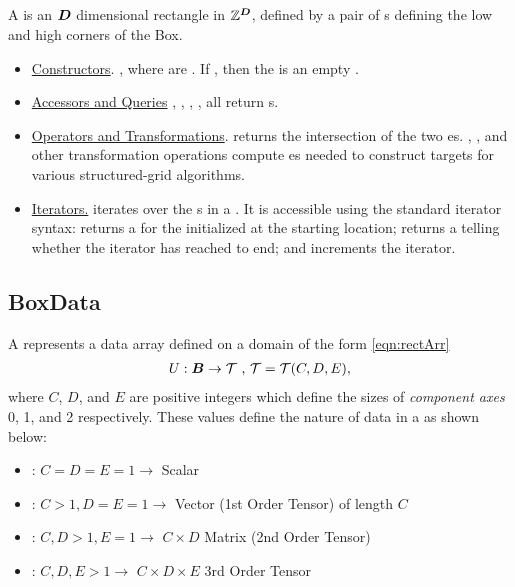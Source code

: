 \documentclass[12pt]{article}
\begin{document}
\subsection{}

A  is an ${\boldsymbol{D}}$ dimensional rectangle in $\mathbb{Z}^{{\boldsymbol{D}}}$, defined by a pair of s defining the low and high corners of the Box. 

\begin{itemize}
\item
\underline{Constructors}. , where  are . If , then the  is an empty .

\item
\underline{Accessors and Queries}
, , ,  ,  all return s. 
\item
\underline{Operators and Transformations}. 
 returns the intersection of the two es. , ,  and other transformation operations compute es needed to construct  targets for various structured-grid algorithms.
\item
\underline{Iterators.}
 iterates over the s in a . It is accessible using the standard iterator syntax:  returns a  for the  initialized at the starting location;  returns a  telling whether the iterator has reached to end; and  increments the iterator.
\end{itemize}
\subsection{BoxData}

A  represents a data array defined on a  domain of the form \eqref{eqn:rectArr}
\begin{gather*}
U:{\boldsymbol{B}} \rightarrow \mathcal{T} \hbox{ , } \mathcal{T} = \mathcal{T}(C,D,E),
\end{gather*}
where $C$, $D$, and $E$ are positive integers which define the sizes of \textit{component axes} 0, 1, and 2 respectively. These values define the nature of data in a  as shown below:

\begin{itemize}
\item: $C=D=E=1\rightarrow$ Scalar
\item: $C>1, D=E=1\rightarrow$ Vector (1st Order Tensor) of length $C$
\item: $C,D>1, E=1\rightarrow$ $C\times D$ Matrix (2nd Order Tensor)
\item: $C,D,E>1\rightarrow$ $C\times D\times E$ 3rd Order Tensor
\end{itemize}
\end{document}
